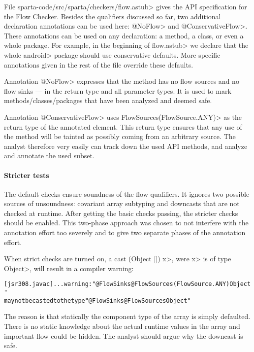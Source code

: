 File \<sparta-code/src/sparta/checkers/flow.astub> gives the API
specification for the Flow Checker.
Besides the qualifiers discussed so far, two additional declaration
annotations can be used here: \<@NoFlow> and \<@ConservativeFlow>.
These annotations can be used on any declaration: a method, a class,
or even a whole package.
For example, in the beginning of \<flow.astub> we declare that the
whole \<android> package should use conservative defaults.
More specific annotations given in the rest of the file override these
defaults.

Annotation \<@NoFlow> expresses that the method has no flow sources
and no flow sinks --- in the return type and all parameter types.
It is used to mark methods/classes/packages that have been analyzed
and deemed safe.

Annotation \<@ConservativeFlow> uses
\<FlowSources(FlowSource.ANY)> as the return type of the annotated
element.
This return type ensures that any use of the method will be tainted as
possibly coming from an arbitrary source.
The analyst therefore very easily can track down the used API methods,
and analyze and annotate the used subset.



\paragraph{Stricter tests}

The default checks ensure soundness of the flow qualifiers.
It ignores two possible sources of unsoundness: covariant array
subtyping and downcasts that are not checked at runtime.
After getting the basic checks passing, the stricter checks should be
enabled.
This two-phase approach was chosen to not interfere with
the annotation effort too severely and to give two separate phases of
the annotation effort.


When strict checks are turned on,
a cast \<(Object []) x>, were \<x> is of type \<Object>, will result
in a compiler warning:

\begin{alltt}
[jsr308.javac] ... warning: "@FlowSinks @FlowSources({FlowSource.ANY}) Object"
       may not be casted to the type "@FlowSinks @FlowSources Object"
\end{alltt}

The reason is that statically the component type of the array is
simply defaulted. There is no static knowledge about the actual
runtime values in the array and important flow could be hidden.
The analyst should argue why the downcast is safe.

